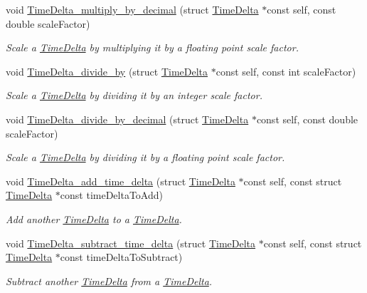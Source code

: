 \begin{DoxyCompactItemize}
void \hyperlink{time-delta_8h_aa1e03be2346f1441127a828a3fe02568}{\-Time\-Delta\-\_\-multiply\-\_\-by\-\_\-decimal} (struct \hyperlink{structTimeDelta}{\-Time\-Delta} $\ast$const self, const double scale\-Factor)
\begin{DoxyCompactList}\small\item\em \-Scale a \hyperlink{structTimeDelta}{\-Time\-Delta} by multiplying it by a floating point scale factor. \end{DoxyCompactList}\item 
void \hyperlink{time-delta_8h_a5c6754df68d1166d92e15c48885e861e}{\-Time\-Delta\-\_\-divide\-\_\-by} (struct \hyperlink{structTimeDelta}{\-Time\-Delta} $\ast$const self, const int scale\-Factor)
\begin{DoxyCompactList}\small\item\em \-Scale a \hyperlink{structTimeDelta}{\-Time\-Delta} by dividing it by an integer scale factor. \end{DoxyCompactList}\item 
void \hyperlink{time-delta_8h_a31fffdb820891d79283aca56a3aeb853}{\-Time\-Delta\-\_\-divide\-\_\-by\-\_\-decimal} (struct \hyperlink{structTimeDelta}{\-Time\-Delta} $\ast$const self, const double scale\-Factor)
\begin{DoxyCompactList}\small\item\em \-Scale a \hyperlink{structTimeDelta}{\-Time\-Delta} by dividing it by a floating point scale factor. \end{DoxyCompactList}\item 
void \hyperlink{time-delta_8h_a7b8c837c0a4c63f4a214ffca0e8c9592}{\-Time\-Delta\-\_\-add\-\_\-time\-\_\-delta} (struct \hyperlink{structTimeDelta}{\-Time\-Delta} $\ast$const self, const struct \hyperlink{structTimeDelta}{\-Time\-Delta} $\ast$const time\-Delta\-To\-Add)
\begin{DoxyCompactList}\small\item\em \-Add another \hyperlink{structTimeDelta}{\-Time\-Delta} to a \hyperlink{structTimeDelta}{\-Time\-Delta}. \end{DoxyCompactList}\item 
void \hyperlink{time-delta_8h_a24fafdc5f4cef060d1d2ad269952f82a}{\-Time\-Delta\-\_\-subtract\-\_\-time\-\_\-delta} (struct \hyperlink{structTimeDelta}{\-Time\-Delta} $\ast$const self, const struct \hyperlink{structTimeDelta}{\-Time\-Delta} $\ast$const time\-Delta\-To\-Subtract)
\begin{DoxyCompactList}\small\item\em \-Subtract another \hyperlink{structTimeDelta}{\-Time\-Delta} from a \hyperlink{structTimeDelta}{\-Time\-Delta}. \end{DoxyCompactList}\item 

\end{DoxyCompactItemize}

